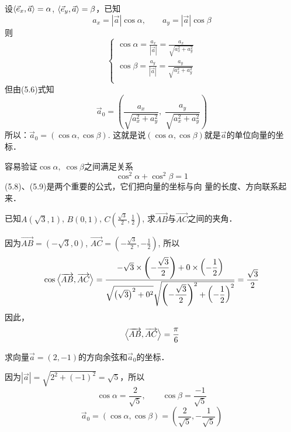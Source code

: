 设$\left\langle \vec{e}_x,\vec{a} \right\rangle=\alpha$, $\left\langle \vec{e}_y,\vec{a} \right\rangle=\beta$，已知
\[a_x=|\vec{a}|\cos\alpha,\qquad a_y=|\vec{a}|\cos\beta\]
则
\begin{equation}
    \begin{cases}
\cos\alpha=\frac{a_x}{|\vec{a}|}=\frac{a_x}{\sqrt{a_x^2+a_y^2}}\\
\cos\beta=\frac{a_y}{|\vec{a}|}=\frac{a_y}{\sqrt{a_x^2+a_y^2}}\\
    \end{cases}
\end{equation}
但由(5.6)式知
\[\vec{a}_0=\left(\frac{a_x}{\sqrt{a_x^2+a_y^2}},\; \frac{a_y}{\sqrt{a_x^2+a_y^2}}\right)\]
所以：$\vec{a}_0=(\cos\alpha,\cos\beta)$. 这就是说$(\cos\alpha,\cos\beta)$就是$\vec{a}$的单位向量的坐标．

容易验证$\cos\alpha,\; \cos\beta$之间满足关系
\begin{equation}
    \cos^2\alpha+\cos^2\beta=1
\end{equation}
(5.8)、(5.9)是两个重要的公式，它们把向量的坐标与向
量的长度、方向联系起来．

\begin{example}
  已知$A(\sqrt{3},1)$, $B(0,1)$, 
$C\left(\frac{\sqrt{3}}{2},\frac{1}{2}\right)$,
求$\Vec{AB}$与$\Vec{AC}$之间的夹角．  
\end{example}

\begin{solution}
因为$\Vec{AB}=(-\sqrt{3},0)$, $\Vec{AC}=\left(-\frac{\sqrt{3}}{2},-\frac{1}{2}\right)$, 所以
\[\cos \left\langle \overrightarrow{AB},\overrightarrow{AC} \right\rangle =\dfrac{-\sqrt{3}\times\left(-\dfrac{\sqrt{3}}{2}\right)+0\times \left(-\dfrac{1}{2}\right)}{\sqrt{\left(\sqrt{3}\right)^2+0^2}\sqrt{\left(-\dfrac{\sqrt{3}}{2}\right)^2+\left(-\dfrac{1}{2}\right)^2}}=\dfrac{\sqrt{3}}{2}\]
因此，
\[\left\langle \overrightarrow{AB},\overrightarrow{AC} \right\rangle=\dfrac{\pi}{6}\]
\end{solution}

\begin{example}
    求向量$\vec{a}=(2,-1)$的方向余弦和$\vec{a}_0$的坐标．
\end{example}

\begin{solution}
因为$|\vec{a}|=\sqrt{2^2+(-1)^2}=\sqrt{5}$，所以
\[\cos\alpha=\frac{2}{\sqrt{5}},\qquad \cos\beta=\frac{-1}{\sqrt{5}}\]
\[\vec{a}_0=(\cos\alpha,\cos\beta)=\left(\frac{2}{\sqrt{5}},-\frac{1}{\sqrt{5}}\right)\]
\end{solution}

